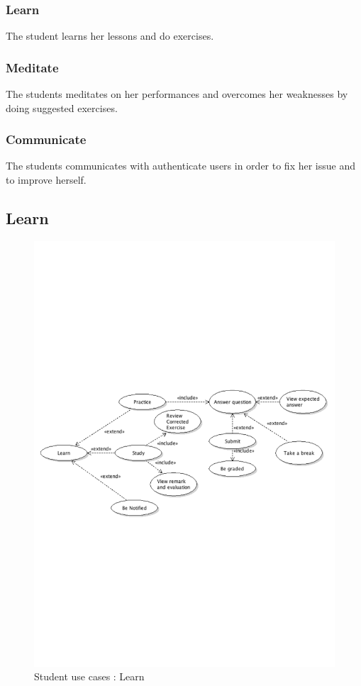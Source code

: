 		\subsubsection{Learn}
			The student learns her lessons and do exercises.
		\subsubsection{Meditate}
			The students meditates on her performances and overcomes her weaknesses by doing suggested exercises.
		\subsubsection{Communicate}
			The students communicates with authenticate users in order to fix her issue and to improve herself.
\newpage
	\subsection{Learn}
		\begin{figure}[ht]
			\begin{center}
				\includegraphics[width=\textwidth,  trim=2cm 10cm 2cm 8cm]{UML_figure/UC/student/UC_Student_Learn.pdf}
				\caption{Student use cases : Learn}
			\end{center}
		\end{figure}
